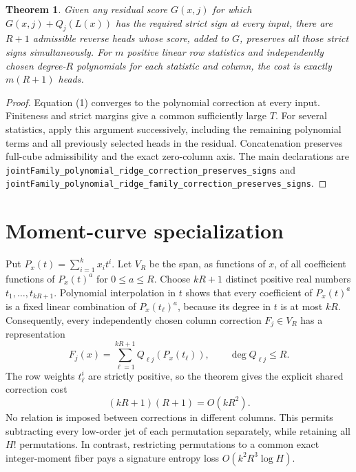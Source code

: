 \documentclass{article}
\newtheorem{theorem}{Theorem}
\begin{document}
\begin{theorem}
Given any residual score $G(x,j)$ for which
$G(x,j)+Q_j(L(x))$ has the required strict sign at every input, there
are $R+1$ admissible reverse heads whose score, added to $G$, preserves
all those strict signs simultaneously. For $m$ positive linear row
statistics and independently chosen degree-$R$ polynomials for each
statistic and column, the cost is exactly $m(R+1)$ heads.
\end{theorem}
\begin{proof}
Equation (1) converges to the polynomial correction at every input.
Finiteness and strict margins give a common sufficiently large $T$.
For several statistics, apply this argument successively, including
the remaining polynomial terms and all previously selected heads in
the residual. Concatenation preserves full-cube admissibility and the
exact zero-column axis. The main declarations are
\texttt{jointFamily\_polynomial\_ridge\_correction\_preserves\_signs}
and
\texttt{jointFamily\_polynomial\_ridge\_family\_correction\_preserves\_signs}.
\end{proof}

\section{Moment-curve specialization}
Put $P_x(t)=\sum_{i=1}^k x_it^i$. Let $V_R$ be the span, as
functions of $x$, of all coefficient functions of $P_x(t)^a$ for
$0\leq a\leq R$. Choose $kR+1$ distinct positive real numbers
$t_1,\ldots,t_{kR+1}$. Polynomial interpolation in $t$ shows that
every coefficient of $P_x(t)^a$ is a fixed linear combination of
$P_x(t_\ell)^a$, because its degree in $t$ is at most $kR$.
Consequently, every independently chosen column correction
$F_j\in V_R$ has a representation
\[
 F_j(x)=\sum_{\ell=1}^{kR+1}Q_{\ell j}(P_x(t_\ell)),
 \qquad \deg Q_{\ell j}\leq R.
\]
The row weights $t_\ell^i$ are strictly positive, so the theorem gives
the explicit shared correction cost
\[
 (kR+1)(R+1)=O(kR^2).
 \tag{2}
\]
No relation is imposed between corrections in different columns.
This permits subtracting every low-order jet of each permutation
separately, while retaining all $H!$ permutations. In contrast, restricting
permutations to a common exact integer-moment fiber pays a signature
entropy loss $O(k^2R^3\log H)$.
\end{document}
